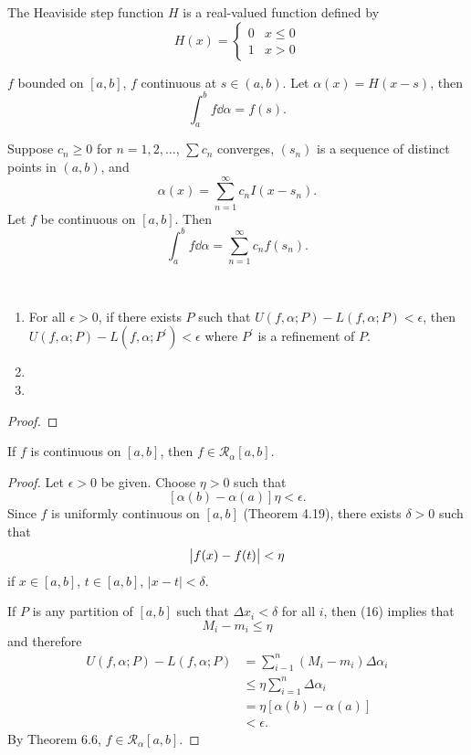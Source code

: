 \begin{example}
The Heaviside step function $H$ is a real-valued function defined by
\[H(x)=\begin{cases}
0&x\le0\\
1&x>0
\end{cases}\]

\begin{proposition*}
$f$ bounded on $[a,b]$, $f$ continuous at $s\in(a,b)$. Let $\alpha(x)=H(x-s)$, then
\[\int_a^b f\dd{\alpha}=f(s).\]
\end{proposition*}

\begin{proposition*}
Suppose $c_n\ge0$ for $n=1,2,\dots$, $\sum c_n$ converges, $(s_n)$ is a sequence of distinct points in $(a,b)$, and
\[\alpha(x)=\sum_{n=1}^{\infty}c_n I(x-s_n).\]
Let $f$ be continuous on $[a,b]$. Then
\[\int_a^b f\dd{\alpha}=\sum_{n=1}^{\infty}c_n f(s_n).\]
\end{proposition*}
\end{example}

\begin{proposition} \
\begin{enumerate}[label=(\roman*)]
\item For all $\epsilon>0$, if there exists $P$ such that $U(f,\alpha;P)-L(f,\alpha;P)<\epsilon$, then $U(f,\alpha;P)-L(f,\alpha;P^\prime)<\epsilon$ where $P^\prime$ is a refinement of $P$.
\item 
\item 
\end{enumerate}
\end{proposition}

\begin{proof}

\end{proof}

\begin{lemma}
If $f$ is continuous on $[a,b]$, then $f\in \mathcal{R}_\alpha[a,b]$.
\end{lemma}

\begin{proof}
Let $\epsilon>0$ be given. Choose $\eta>0$ such that
\[[\alpha(b)-\alpha(a)]\eta<\epsilon.\]
Since $f$ is uniformly continuous on $[a,b]$ (Theorem 4.19), there exists $\delta>0$ such that
\[\left|f(x)-f(t)\right|<\eta\]
if $x\in[a,b]$, $t\in[a,b]$, $|x-t|<\delta$.

If $P$ is any partition of $[a,b]$ such that $\Delta x_i<\delta$ for all $i$, then (16) implies that
\[M_i-m_i\le\eta\]
and therefore
\begin{align*}
U(f,\alpha;P)-L(f,\alpha;P)
&=\sum_{i-1}^{n}(M_i-m_i)\Delta\alpha_i\\
&\le\eta\sum_{i=1}^{n}\Delta\alpha_i\\
&=\eta[\alpha(b)-\alpha(a)]\\
&<\epsilon.
\end{align*}
By Theorem 6.6, $f\in\mathcal{R}_\alpha[a,b]$.
\end{proof}

